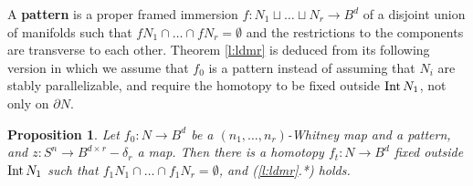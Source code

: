 \documentclass[12pt]{article}
\def\diag{\delta}
\def\pii{\rho}
\def\Int{\mathop{\fam0 Int}}
\theoremstyle{plain}
\newtheorem{Proposition}[Theorem]{Proposition}
\theoremstyle{definition}
\begin{document}

A {\bf pattern} is a proper framed immersion $f:N_1\sqcup\ldots\sqcup N_r\to B^d$ of a disjoint union of manifolds such that $fN_1\cap\ldots\cap fN_r=\emptyset$ and the restrictions to the components are transverse to each other.
Theorem \ref{l:ldmr} is deduced from its following version in which we assume that $f_0$ is a pattern instead of assuming that $N_i$ are stably parallelizable, and require the homotopy to be fixed outside $\Int N_1$, not only on $\partial N$.

\begin{Proposition}\label{l:ldmrin}
Let $f_0:N\to B^d$ be a $(n_1,\ldots,n_r)$-Whitney map and a pattern, and $z:S^n\to B^{d\times r}-\diag_r$ a map.
Then there is a homotopy $f_t:N\to B^d$ fixed outside $\Int N_1$ such that
$f_1N_1\cap\ldots\cap f_1N_r=\emptyset$, and (\ref{l:ldmr}.*) holds.
\end{Proposition}

\end{document}
